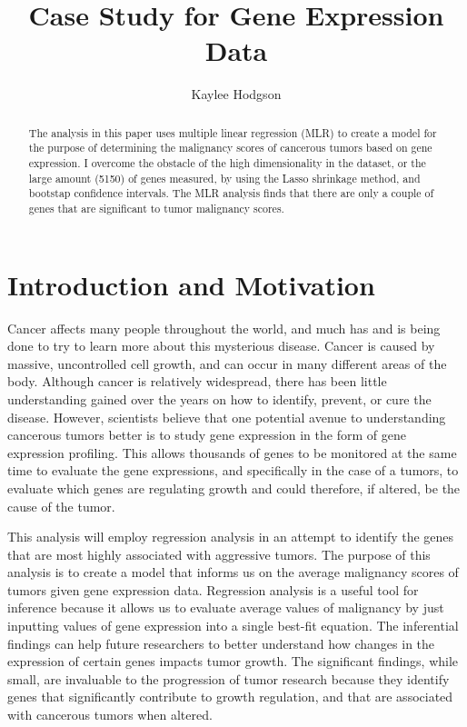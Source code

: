 \documentclass{svproc}
\begin{document}
\mainmatter              
\title{Case Study for Gene Expression Data}
%
\author{Kaylee Hodgson}
%

\maketitle

\begin{abstract}
The analysis in this paper uses multiple linear regression (MLR) to create a model for the purpose of determining the malignancy scores of cancerous tumors based on gene expression. I overcome the obstacle of the high dimensionality in the dataset, or the large amount (5150) of genes measured, by using the Lasso shrinkage method, and bootstap confidence intervals. The MLR analysis finds that there are only a couple of genes that are significant to tumor malignancy scores. 
\end{abstract}

\section{Introduction and Motivation}

Cancer affects many people throughout the world, and much has and is being done to try to learn more about this mysterious disease. Cancer is caused by massive, uncontrolled cell growth, and can occur in many different areas of the body. Although cancer is relatively widespread, there has been little understanding gained over the years on how to identify, prevent, or cure the disease. However, scientists believe that one potential avenue to understanding cancerous tumors better is to study gene expression in the form of gene expression profiling. This allows thousands of genes to be monitored at the same time to evaluate the gene expressions, and specifically in the case of a tumors, to evaluate which genes are regulating growth and could therefore, if altered, be the cause of the tumor. 

This analysis will employ regression analysis in an attempt to identify the genes that are most highly associated with aggressive tumors. The purpose of this analysis is to create a model that informs us on the average malignancy scores of tumors given gene expression data. Regression analysis is a useful tool for inference because it allows us to evaluate average values of malignancy by just inputting values of gene expression into a single best-fit equation. The inferential findings can help future researchers to better understand how changes in the expression of certain genes impacts tumor growth. The significant findings, while small, are invaluable to the progression of tumor research because they identify genes that significantly contribute to growth regulation, and that are associated with cancerous tumors when altered. 
\end{document}

